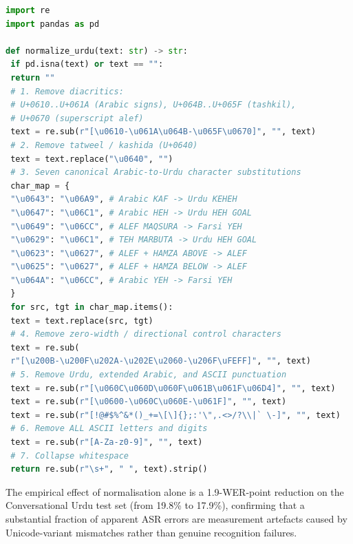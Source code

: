 \begin{lstlisting}[language=Python,caption={Stage~0 -- Urdu text normalisation (\texttt{coral\_utility\_functions.py}). Urdu code points are shown as Python \texttt{\textbackslash uNNNN} escapes for portability.},label={lst:normalize-urdu}]
import re
import pandas as pd

def normalize_urdu(text: str) -> str:
 if pd.isna(text) or text == "":
 return ""
 # 1. Remove diacritics:
 # U+0610..U+061A (Arabic signs), U+064B..U+065F (tashkil),
 # U+0670 (superscript alef)
 text = re.sub(r"[\u0610-\u061A\u064B-\u065F\u0670]", "", text)
 # 2. Remove tatweel / kashida (U+0640)
 text = text.replace("\u0640", "")
 # 3. Seven canonical Arabic-to-Urdu character substitutions
 char_map = {
 "\u0643": "\u06A9", # Arabic KAF -> Urdu KEHEH
 "\u0647": "\u06C1", # Arabic HEH -> Urdu HEH GOAL
 "\u0649": "\u06CC", # ALEF MAQSURA -> Farsi YEH
 "\u0629": "\u06C1", # TEH MARBUTA -> Urdu HEH GOAL
 "\u0623": "\u0627", # ALEF + HAMZA ABOVE -> ALEF
 "\u0625": "\u0627", # ALEF + HAMZA BELOW -> ALEF
 "\u064A": "\u06CC", # Arabic YEH -> Farsi YEH
 }
 for src, tgt in char_map.items():
 text = text.replace(src, tgt)
 # 4. Remove zero-width / directional control characters
 text = re.sub(
 r"[\u200B-\u200F\u202A-\u202E\u2060-\u206F\uFEFF]", "", text)
 # 5. Remove Urdu, extended Arabic, and ASCII punctuation
 text = re.sub(r"[\u060C\u060D\u060F\u061B\u061F\u06D4]", "", text)
 text = re.sub(r"[\u0600-\u060C\u060E-\u061F]", "", text)
 text = re.sub(r"[!@#$%^&*()_+=\[\]{};:'\",.<>/?\\|` \-]", "", text)
 # 6. Remove ALL ASCII letters and digits
 text = re.sub(r"[A-Za-z0-9]", "", text)
 # 7. Collapse whitespace
 return re.sub(r"\s+", " ", text).strip()
\end{lstlisting}

The empirical effect of normalisation alone is a 1.9-WER-point reduction on the Conversational Urdu test set (from 19.8\% to 17.9\%), confirming that a substantial fraction of apparent ASR errors are measurement artefacts caused by Unicode-variant mismatches rather than genuine recognition failures.

